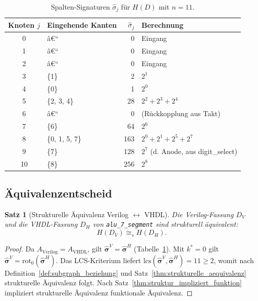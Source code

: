 ﻿\documentclass[12pt,a4paper]{report}
\newtheorem{theorem}{Satz}[section]
\begin{document}
\begin{table}[H]
	\centering
	\begin{tabular}{|c|l|r|l|}
		\hline
		\textbf{Knoten $j$} & \textbf{Eingehende Kanten} & $\hat{\sigma}_j$ & \textbf{Berechnung} \\
		\hline
		0  & â€“                                   &   0 & Eingang \\
		1  & â€“                                   &   0 & Eingang \\
		2  & â€“                                   &   0 & Eingang \\
		3  & \{1\}                               &   2 & $2^1$ \\
		4  & \{0\}                               &   1 & $2^0$ \\
		5  & \{2, 3, 4\}                         &  28 & $2^2 + 2^3 + 2^4$ \\
		6  & â€“                                   &   0 & (Rückkopplung aus Takt) \\
		7  & \{6\}                               &  64 & $2^6$ \\
		8  & \{0, 1, 5, 7\}                      & 163 & $2^0+2^1+2^5+2^7$ \\
		9  & \{7\}                               & 128 & $2^7$ (d. Anode, aus digit\_select) \\
		10 & \{8\}                               & 256 & $2^8$ \\
		\hline
	\end{tabular}
	\caption{Spalten-Signaturen $\hat{\sigma}_j$ für $H(D)$ mit $n = 11$.}
	\label{tab:signaturen_vv}
\end{table}

\subsection{Äquivalenzentscheid}

\begin{theorem}[Strukturelle Äquivalenz Verilog $\leftrightarrow$ VHDL]
	\label{thm:vv_strukturell}
	Die Verilog-Fassung $D_V$ und die VHDL-Fassung $D_H$ von
	\texttt{alu\_7\_segment} sind strukturell äquivalent:
	\[
	H(D_V) \cong_s H(D_H).
	\]
\end{theorem}

\begin{proof}
	Da $A_\mathrm{Verilog} = A_\mathrm{VHDL}$, gilt
	$\hat{\boldsymbol{\sigma}}^V = \hat{\boldsymbol{\sigma}}^H$ (Tabelle~\ref{tab:signaturen_vv}).
	Mit $k^* = 0$ gilt
	$\hat{\boldsymbol{\sigma}}^V = \mathrm{rot}_0(\hat{\boldsymbol{\sigma}}^H)$.
	Das LCS-Kriterium liefert
	$\mathrm{lcs}(\hat{\boldsymbol{\sigma}}^V, \hat{\boldsymbol{\sigma}}^H) = 11 \geq 2$,
	womit nach Definition~\ref{def:subgraph_beziehung} und
	Satz~\ref{thm:strukturelle_aequivalenz} strukturelle Äquivalenz folgt.
	Nach Satz~\ref{thm:struktur_impliziert_funktion} impliziert strukturelle
	Äquivalenz funktionale Äquivalenz.
\end{proof}
\end{document}

